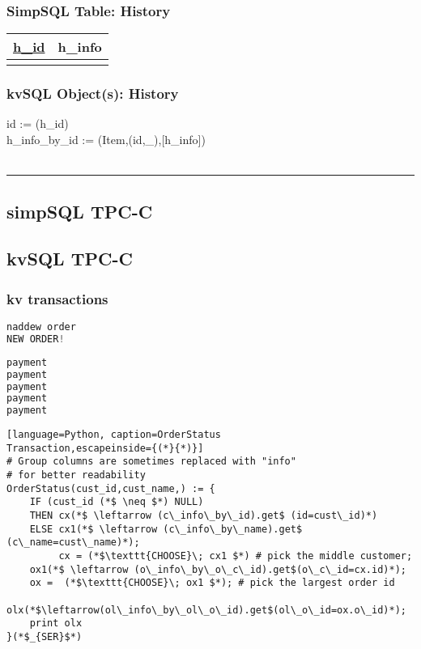 \documentclass[12pt,letter]{article}
\begin{document}
\subsubsection*{SimpSQL Table: History}  
\begin{tabular}{ |c|c| }
 \hline
 \underline{h\_id} & h\_info\\
 \hline
 &   \\
 \hline
\end{tabular}

\subsubsection*{kvSQL Object(s): History}  
id := (h\_id)\\
 h\_info\_by\_id := 
(Item,(id,\_),[h\_info]) \\
\\
\hrule










\subsection*{simpSQL TPC-C}







\subsection*{kvSQL TPC-C}
\subsubsection{kv transactions}
\begin{lstlisting}[language=Python, caption=NewOrder Transaction]
naddew order
NEW ORDER!
\end{lstlisting}

\begin{lstlisting}[language=Python, caption=Payment Transaction]
payment
payment
payment
payment
payment
\end{lstlisting}
\begin{lstlisting}[language=Python, caption=OrderStatus
Transaction,escapeinside={(*}{*)}]
# Group columns are sometimes replaced with "info" 
# for better readability 
OrderStatus(cust_id,cust_name,) := {
	IF (cust_id (*$ \neq $*) NULL)
	THEN cx(*$ \leftarrow (c\_info\_by\_id).get$ (id=cust\_id)*)  
	ELSE cx1(*$ \leftarrow (c\_info\_by\_name).get$ (c\_name=cust\_name)*);
	     cx = (*$\texttt{CHOOSE}\; cx1 $*) # pick the middle customer;
	ox1(*$ \leftarrow (o\_info\_by\_o\_c\_id).get$(o\_c\_id=cx.id)*);
	ox =  (*$\texttt{CHOOSE}\; ox1 $*);	# pick the largest order id
	olx(*$\leftarrow(ol\_info\_by\_ol\_o\_id).get$(ol\_o\_id=ox.o\_id)*);
	print olx
}(*$_{SER}$*)
\end{lstlisting}
\end{document}
